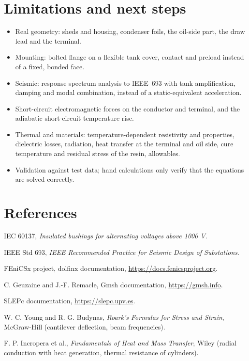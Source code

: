 \documentclass[11pt,a4paper]{article}
\begin{document}
\section{Limitations and next steps}
\begin{itemize}
\item Real geometry: sheds and housing, condenser foils, the oil-side part, the draw lead and the terminal.
\item Mounting: bolted flange on a flexible tank cover, contact and preload instead of a fixed, bonded face.
\item Seismic: response spectrum analysis to IEEE~693 with tank amplification, damping and modal combination, instead of a static-equivalent acceleration.
\item Short-circuit electromagnetic forces on the conductor and terminal, and the adiabatic short-circuit temperature rise.
\item Thermal and materials: temperature-dependent resistivity and properties, dielectric losses, radiation, heat transfer at the terminal and oil side, cure temperature and residual stress of the resin, allowables.
\item Validation against test data; hand calculations only verify that the equations are solved correctly.
\end{itemize}

\section{References}
{\small
\begin{enumerate}[label={[\arabic*]}]
\item IEC 60137, \emph{Insulated bushings for alternating voltages above 1000 V}.
\item IEEE Std 693, \emph{IEEE Recommended Practice for Seismic Design of Substations}.
\item FEniCSx project, dolfinx documentation, \url{https://docs.fenicsproject.org}.
\item C. Geuzaine and J.-F. Remacle, Gmsh documentation, \url{https://gmsh.info}.
\item SLEPc documentation, \url{https://slepc.upv.es}.
\item W. C. Young and R. G. Budynas, \emph{Roark's Formulas for Stress and Strain}, McGraw-Hill (cantilever deflection, beam frequencies).
\item F. P. Incropera et al., \emph{Fundamentals of Heat and Mass Transfer}, Wiley (radial conduction with heat generation, thermal resistance of cylinders).
\end{enumerate}}
\end{document}

